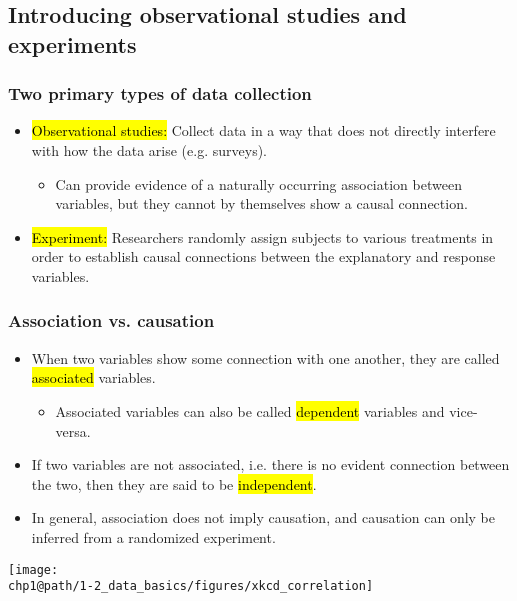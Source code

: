 \documentclass[slidestop,compress,mathserif]{beamer}
\makeatletter
\def\chp1@path{../../Chp 1}
\makeatother
\begin{document}

\subsection{Introducing observational studies and experiments}


\begin{frame}
\frametitle{Two primary types of data collection}

\begin{itemize}

\item \hl{Observational studies:} Collect data in a way that does not directly interfere with how the data arise (e.g. surveys).
\begin{itemize}
\item Can provide evidence of a naturally occurring association between variables, but they cannot by themselves show a causal connection.
\end{itemize}

\pause

\item \hl{Experiment:} Researchers randomly assign subjects to various treatments in order to establish causal connections between the explanatory and response variables.


\end{itemize}

\end{frame}


\begin{frame}
\frametitle{Association vs. causation}

\begin{itemize}

\item When two variables show some connection with one another, they are called \hl{associated} variables.
\begin{itemize}
\item Associated variables can also be called \hl{dependent} variables and vice-versa.
\end{itemize}

\item If two variables are not associated, i.e. there is no evident connection between the two, then they are said to be \hl{independent}.

\item In general, association does not imply causation, and causation can only be inferred from a randomized experiment.

\end{itemize}

\begin{center}
\texttt{[image: \\chp1@path/1-2\_data\_basics/figures/xkcd\_correlation]} \\
{\tiny {}}
\end{center}

\end{frame}
\end{document}
